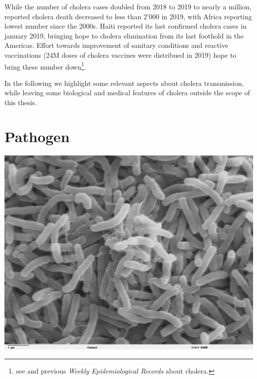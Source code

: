 While the number of cholera cases doubled from 2018 to 2019 to nearly a million, reported cholera death decreased to less than 2'000 in 2019, with Africa reporting lowest number since the 2000s. Haiti reported its last confirmed cholera cases in january 2019, bringing hope to cholera elimination from its last foothold in the Americas. Effort towards improvement of sanitary conditions and reactive vaccinations (24M doses of cholera vaccines were distribued in 2019) hope to bring these number down\footnote{see  and previous \textit{Weekly Epidemiological Records} about cholera.}. 

In the following we highlight some relevant aspects about cholera transmission, while leaving some biological and medical features of cholera outside the scope of this thesis.


\section{Pathogen} 
\begin{marginfigure}[6\baselineskip]
\centering
\includegraphics{fig/vibrio}
\label{rain}
\end{marginfigure}
